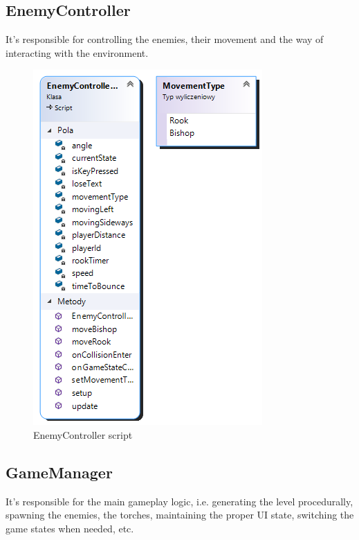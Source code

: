 \documentclass[12pt, english]{article}
\begin{document}
\subsection{EnemyController}
It's responsible for controlling the enemies, their movement and the way of
interacting with the environment.

\begin{figure}
	\centering
	\includegraphics[width=\textwidth, height=0.9\textheight, keepaspectratio]{image5.png}
	\caption{EnemyController script}
	\label{figure_enemycontrollerscript}
\end{figure}

\subsection{GameManager}
It's responsible for the main gameplay logic, i.e. generating the level
procedurally, spawning the enemies, the torches, maintaining the proper UI
state, switching the game states when needed, etc.
\end{document}
